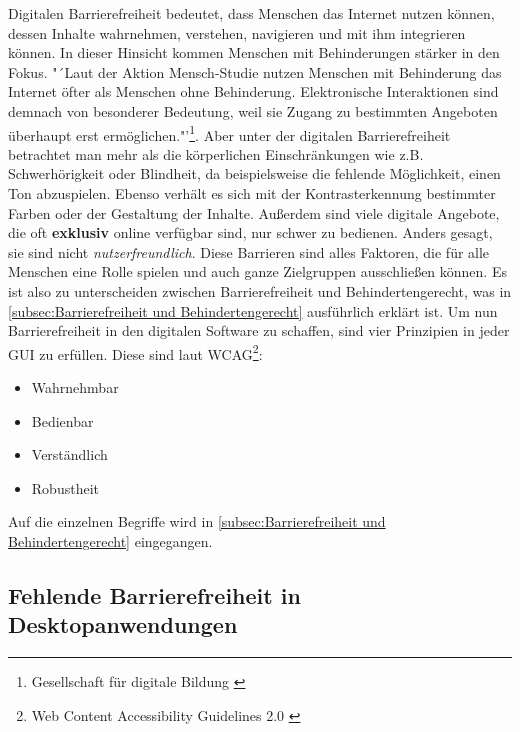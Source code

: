 Digitalen Barrierefreiheit bedeutet, dass Menschen das Internet nutzen können, dessen Inhalte wahrnehmen, verstehen, navigieren und mit ihm integrieren können. In dieser Hinsicht kommen Menschen mit Behinderungen stärker in den Fokus. "´Laut der Aktion Mensch-Studie nutzen Menschen mit Behinderung das Internet öfter als Menschen ohne Behinderung. Elektronische Interaktionen sind demnach von besonderer Bedeutung, weil sie Zugang zu bestimmten Angeboten überhaupt erst ermöglichen."'\footnote{Gesellschaft für digitale Bildung \cite{GFDB}}. Aber unter der digitalen Barrierefreiheit betrachtet man mehr als die körperlichen Einschränkungen wie z.B. Schwerhörigkeit oder Blindheit, da beispielsweise die fehlende Möglichkeit, einen Ton abzuspielen. Ebenso verhält es sich mit der Kontrasterkennung bestimmter Farben oder der Gestaltung der Inhalte. Außerdem sind viele digitale Angebote, die oft \textbf{exklusiv} online verfügbar sind, nur schwer zu bedienen. Anders gesagt, sie sind nicht \textit{nutzerfreundlich}. Diese Barrieren sind alles Faktoren, die für alle Menschen eine Rolle spielen und auch ganze Zielgruppen ausschließen können. Es ist also zu unterscheiden zwischen Barrierefreiheit und Behindertengerecht, was in \cref{subsec:Barrierefreiheit und Behindertengerecht} ausführlich erklärt ist. Um nun Barrierefreiheit in den digitalen Software zu schaffen, sind vier Prinzipien in jeder \ac{GUI} zu erfüllen. Diese sind laut \ac{WCAG}\footnote{Web Content Accessibility Guidelines 2.0 \cite{caldwell2008web}}:

\begin{itemize}
	\item Wahrnehmbar
	\item Bedienbar
	\item Verständlich
	\item Robustheit
\end{itemize}

Auf die einzelnen Begriffe wird in \cref{subsec:Barrierefreiheit und Behindertengerecht} eingegangen.

\subsection{Fehlende Barrierefreiheit in Desktopanwendungen}

